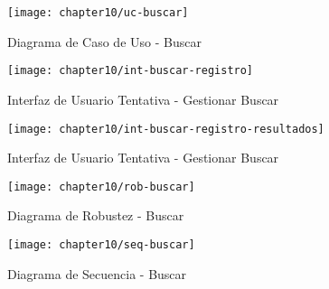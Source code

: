 \begin{figure}[H]
        \centering
        \texttt{[image: chapter10/uc-buscar]}
        \caption{Diagrama de Caso de Uso - Buscar}
        \label{fig:uc-buscar}
    \end{figure}
    
      \begin{figure}[H]
        \centering
        \texttt{[image: chapter10/int-buscar-registro]}
        \caption{Interfaz de Usuario Tentativa - Gestionar Buscar}
        \label{fig:int-buscar-registro}
    \end{figure}
    
     \begin{figure}[H]
        \centering
        \texttt{[image: chapter10/int-buscar-registro-resultados]}
        \caption{Interfaz de Usuario Tentativa - Gestionar Buscar}
        \label{fig:int-buscar-registro-resultados}
    \end{figure}
    
 \begin{landscape}
    \begin{figure}[H]
        \centering
        \texttt{[image: chapter10/rob-buscar]}
        \caption{Diagrama de Robustez - Buscar}
        \label{fig:rob-buscar}
    \end{figure}
    
    \begin{figure}[H]
        \centering
        \texttt{[image: chapter10/seq-buscar]}
        \caption{Diagrama de Secuencia - Buscar }
        \label{fig:seq-buscar}
    \end{figure}
    \end{landscape}
    
